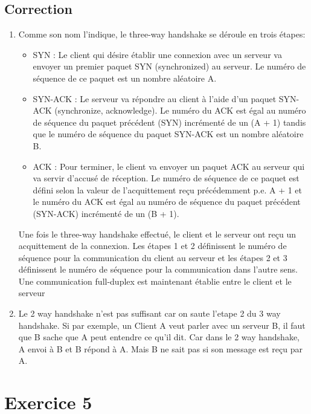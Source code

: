 \documentclass[a4paper, 11pt, titlepage]{article}
\begin{document}
\subsection{Correction}
\begin{enumerate}[label=(\alph*)]
\item
Comme son nom l'indique, le three-way handshake se déroule en trois étapes:

\begin{itemize}

\item SYN : Le client qui désire établir une connexion avec un serveur va envoyer un premier paquet SYN (synchronized) au serveur. Le numéro de séquence de ce paquet est un nombre aléatoire A.
\item SYN-ACK : Le serveur va répondre au client à l'aide d'un paquet SYN-ACK (synchronize, acknowledge). Le numéro du ACK est égal au numéro de séquence du paquet précédent (SYN) incrémenté de un (A + 1) tandis que le numéro de séquence du paquet SYN-ACK est un nombre aléatoire B.
\item ACK : Pour terminer, le client va envoyer un paquet ACK au serveur qui va servir d'accusé de réception. Le numéro de séquence de ce paquet est défini selon la valeur de l'acquittement reçu précédemment p.e. A + 1 et le numéro du ACK est égal au numéro de séquence du paquet précédent (SYN-ACK) incrémenté de un (B + 1).
\end{itemize}

Une fois le three-way handshake effectué, le client et le serveur ont reçu un acquittement de la connexion. Les étapes 1 et 2 définissent le numéro de séquence pour la communication du client au serveur et les étapes 2 et 3 définissent le numéro de séquence pour la communication dans l'autre sens. Une communication full-duplex est maintenant établie entre le client et le serveur

\item
Le 2 way handshake n'est pas suffisant car on saute l'etape 2 du 3 way handshake. Si par exemple, un Client A veut parler avec un serveur B, il faut que B sache que A peut entendre ce qu'il dit. Car dans le 2 way handshake, A envoi à B et B répond à A. Mais B ne sait pas si son message est reçu par A.

\end{enumerate}



\section{Exercice 5}
\end{document}
